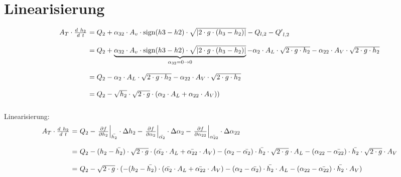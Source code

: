 \section{Linearisierung}
\[
\begin{array}{@{~}l@{~}l@{~}}
A_T \cdot \frac{d~h_2}{d~t} 
    &= Q_2 
    + \alpha_{32} \cdot A_v \cdot \sign(h3-h2) 
    \cdot \sqrt{|2 \cdot g \cdot (h_3 - h_2)|}
    - Q_{l,2}
    - {Q'}_{l,2} \\\\

    &= Q_2 
    + \underbrace{\alpha_{32} \cdot A_v \cdot \sign(h3-h2) 
    \cdot \sqrt{|2 \cdot g \cdot (h_3 - h_2)|}}
    _{\alpha_{32} = 0 \rightarrow 0} 
    - \alpha_{2} \cdot A_L \cdot \sqrt{2 \cdot g \cdot h_2}
    - \alpha_{22} \cdot A_V \cdot \sqrt{2 \cdot g \cdot h_2} \\\\

    &= Q_2 
    - \alpha_{2} \cdot A_L \cdot \sqrt{2 \cdot g \cdot h_2}
    - \alpha_{22} \cdot A_V \cdot \sqrt{2 \cdot g \cdot h_2} \\\\

    &= Q_2 - \sqrt{h_2} \cdot \sqrt{2 \cdot g} \cdot 
    (\alpha_2 \cdot A_L + \alpha_{22} \cdot A_V)) \\\\
\end{array}
\]
Linearisierung: 
\[
\begin{array}{@{~}l@{~}l@{~}l@{~}}
    A_T \cdot \frac{d~h_2}{d~t} 
    &=& Q_2 
    - \left. \frac{\partial f}{\partial h_2} \right\rvert_{\bar{h_2}} \cdot \Delta h_2
    - \left. \frac{\partial f}{\partial \alpha_{2}} \right\rvert_{\bar{\alpha_{2}}} \cdot \Delta \alpha_{2}
    - \left. \frac{\partial f}{\partial \alpha_{22}} \right\rvert_{\bar{\alpha_{22}}} \cdot \Delta \alpha_{22} \\\\

    &=& Q_2 
     - (h_2 - \bar{h_2}) \cdot \sqrt{2 \cdot g} \cdot (\bar{\alpha_2} \cdot A_L + \bar{\alpha_{22}} \cdot A_V) 
     - (\alpha_2 - \bar{\alpha_2}) \cdot \bar{h_2} \cdot \sqrt{2 \cdot g} \cdot A_L 
     - (\alpha_{22} - \bar{\alpha_{22}}) \cdot \bar{h_2} \cdot \sqrt{2 \cdot g} \cdot A_V \\\\

    &=& Q_2 - \sqrt{2 \cdot g} \cdot ( 
     - (h_2 - \bar{h_2}) \cdot (\bar{\alpha_2} \cdot A_L + \bar{\alpha_{22}} \cdot A_V) 
     - (\alpha_2 - \bar{\alpha_2}) \cdot \bar{h_2} \cdot A_L 
     - (\alpha_{22} - \bar{\alpha_{22}}) \cdot \bar{h_2} \cdot A_V ) \\
\end{array}
\]
